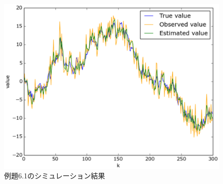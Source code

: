 \documentclass[a4paper,11pt]{jarticle}
\begin{document}
\begin{figure}[tb]
 \begin{center}
  \includegraphics[scale=0.9]{../figure/eps/sim.eps}
  \caption{例題6.1のシミュレーション結果}
  \label{fig:sim}
 \end{center}
\end{figure}
\end{document}
